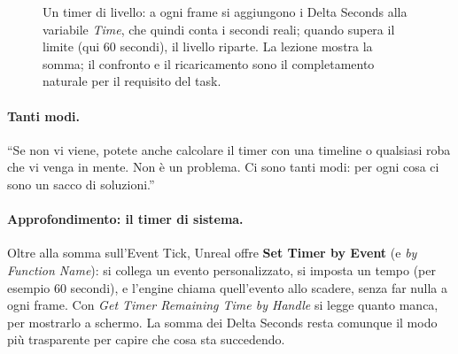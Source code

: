 \begin{figure}[htbp]
\centering
\begin{bpgraph}
\end{bpgraph}
\caption{Un timer di livello: a ogni frame si aggiungono i Delta Seconds alla
variabile \emph{Time}, che quindi conta i secondi reali; quando supera il limite
(qui 60 secondi), il livello riparte. La lezione mostra la somma; il confronto
e il ricaricamento sono il completamento naturale per il requisito del task.}
\label{gd12:fig:timer}
\end{figure}

\paragraph{Tanti modi.} ``Se non vi viene, potete anche calcolare il timer con
una timeline o qualsiasi roba che vi venga in mente. Non è un problema. Ci sono
tanti modi: per ogni cosa ci sono un sacco di soluzioni.''

\paragraph{Approfondimento: il timer di sistema.} Oltre alla somma sull'Event
Tick, Unreal offre \textbf{Set Timer by Event} (e \emph{by Function Name}):
si collega un evento personalizzato, si imposta un tempo (per esempio 60
secondi), e l'engine chiama quell'evento allo scadere, senza far nulla a ogni
frame. Con \emph{Get Timer Remaining Time by Handle} si legge quanto manca, per
mostrarlo a schermo. La somma dei Delta Seconds resta comunque il modo più
trasparente per capire che cosa sta succedendo.

